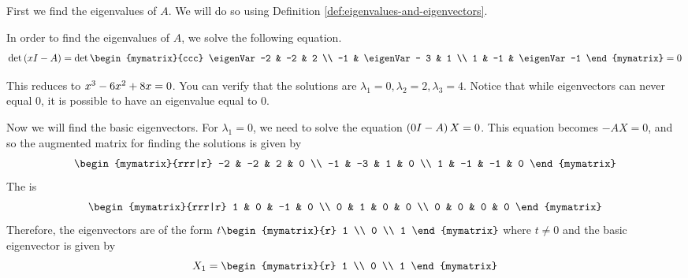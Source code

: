 \begin{solution}
First we find the eigenvalues of $A$. We will do so using Definition
\ref{def:eigenvalues-and-eigenvectors}. 

In order to find the eigenvalues of $A$, we solve the following equation.
\begin{equation*}
\det \tup{\eigenVar I -A } =
\det  \begin{mymatrix}{ccc}
\eigenVar -2 & -2 & 2 \\
 -1 & \eigenVar - 3  & 1 \\
1 & -1 &  \eigenVar  -1 
\end{mymatrix}
 =0
\end{equation*}

This reduces to $ x^{3}-6 x^{2}+8x =0$. You can verify that the
solutions are $ \lambda_1 = 0, \lambda_2 = 2, \lambda_3 = 4$.
Notice that while eigenvectors can never equal $0$, it is possible to have an eigenvalue equal to $0$. 

Now we will find the basic eigenvectors. For $\lambda_1 =0$, we need to solve the equation
$\left(0 I - A \right) X = 0$. This equation becomes $-AX=0$, and so the augmented matrix for finding
the solutions is given by 
\begin{equation*}
\begin{mymatrix}{rrr|r}
-2 & -2 & 2 & 0 \\
-1 & -3 & 1 & 0 \\
1 & -1 & -1 & 0
\end{mymatrix}
\end{equation*}
The {\rref} is
\begin{equation*}
\begin{mymatrix}{rrr|r}
1 & 0 & -1 & 0 \\
0 & 1 &  0 & 0 \\
0 & 0 &  0 & 0
\end{mymatrix}
\end{equation*}
Therefore, the eigenvectors are of the form $ t\begin{mymatrix}{r}
1 \\
0 \\
1
\end{mymatrix}$ where $t\neq 0$ and the basic eigenvector is given by
\begin{equation*}
X_1
=
\begin{mymatrix}{r}
1 \\
0 \\
1
\end{mymatrix}
\end{equation*}


\end{solution}
